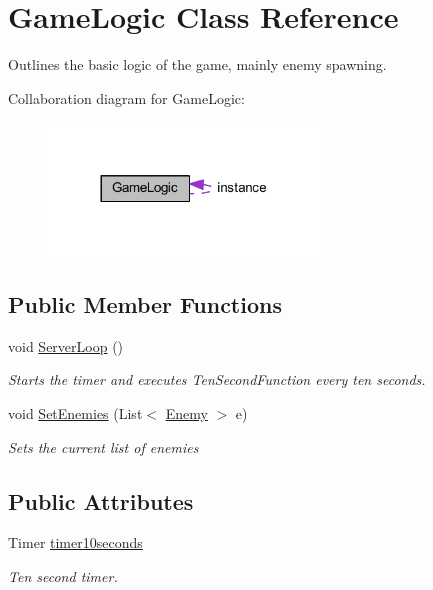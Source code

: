 \hypertarget{class_game_logic}{}\section{Game\+Logic Class Reference}
\label{class_game_logic}


Outlines the basic logic of the game, mainly enemy spawning.  




Collaboration diagram for Game\+Logic\+:\nopagebreak
\begin{figure}[H]
\begin{center}
\leavevmode
\includegraphics[width=204pt]{class_game_logic__coll__graph}
\end{center}
\end{figure}
\subsection*{Public Member Functions}
\begin{DoxyCompactItemize}
\item 
void \mbox{\hyperlink{class_game_logic_aecfe8ccaaf740e73c68068f089b282a5}{Server\+Loop}} ()
\begin{DoxyCompactList}\small\item\em Starts the timer and executes Ten\+Second\+Function every ten seconds. \end{DoxyCompactList}\item 
void \mbox{\hyperlink{class_game_logic_a3a11f40bd998b28362e0a1770d6ae3ba}{Set\+Enemies}} (List$<$ \mbox{\hyperlink{class_enemy}{Enemy}} $>$ e)
\begin{DoxyCompactList}\small\item\em Sets the current list of enemies \end{DoxyCompactList}\end{DoxyCompactItemize}
\subsection*{Public Attributes}
\begin{DoxyCompactItemize}
\item 
Timer \mbox{\hyperlink{class_game_logic_a06a60d253f3ee354c41747c6269c9e0c}{timer10seconds}}
\begin{DoxyCompactList}\small\item\em Ten second timer. \end{DoxyCompactList}\end{DoxyCompactItemize}
